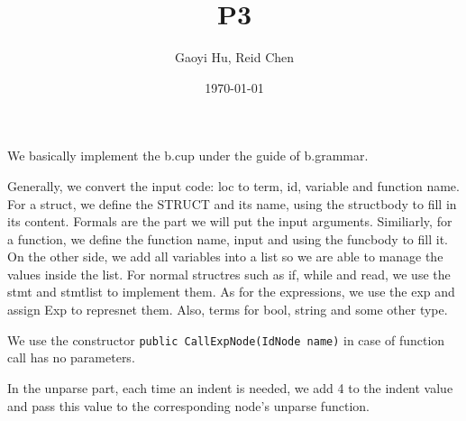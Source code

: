 \documentclass[11pt]{article}
\author{Gaoyi Hu, Reid Chen}
\date{\today}
\title{P3}
\begin{document}
\maketitle
\tableofcontents

We basically implement the b.cup under the guide of b.grammar.

Generally, we convert the input code: loc to term, id, variable and function name.
For a struct, we define the STRUCT and its name, using the structbody to fill in its content. Formals are the part we will put the input arguments. Similiarly, for a function, we define the function name, input and using the funcbody to fill it.
On the other side, we add all variables into a list so we are able to manage the values inside the list.
For normal structres such as if, while and read, we use the stmt and stmtlist to implement them. As for the expressions, we use the exp and assign Exp to represnet them. Also, terms for bool, string and some other type. 

We use the constructor \texttt{public CallExpNode(IdNode name)} in case of function call has no parameters.

In the unparse part, each time an indent is needed, we add 4 to the indent value and pass this value to the corresponding node's unparse function.
\end{document}

